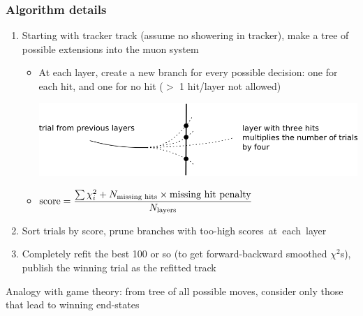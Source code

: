 \documentclass[compress]{beamer}
\begin{document}
\begin{frame}
\frametitle{Algorithm details}

\begin{enumerate}
\item Starting with tracker track (assume no showering in tracker),
  make a tree of possible extensions into the muon system
\begin{itemize}
\item At each layer, create a new branch for every possible decision:
  one for each hit, and one for no hit ($>$ 1 hit/layer not allowed)

\includegraphics[width=\linewidth]{trial_multiplication.png}

\item $\displaystyle \mbox{score} = \frac{\sum \chi^2_i + N_{\mbox{\scriptsize missing hits}} \times \mbox{missing hit penalty}}{N_{\mbox{\scriptsize layers}}} $

\end{itemize}

\item Sort trials by score, prune branches with too-high \mbox{scores at each layer\hspace{-1 cm}}

\item Completely refit the best 100 or so (to get forward-backward
  smoothed $\chi^2$s), publish the winning trial as the refitted track
\end{enumerate}

Analogy with game theory: from tree of all possible moves, consider only those that lead to winning end-states

\end{frame}
\end{document}
